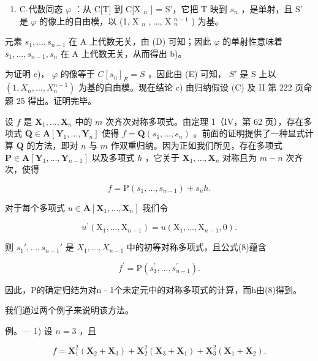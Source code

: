 \begin{enumerate}
\def\labelenumi{(\Alph{enumi})}
\setcounter{enumi}{4}
\tightlist
\item
  C-代数同态 \(\varphi\) ：从 C{[}T{]} 到 C{[}X \(_n\) {]} = S'，它把 T 映到 \(s_n\) ，是单射，且 S' 是 \(\varphi\) 的像上的自由模，以 (1, X \(_n\) , \ldots, X \(_n^{n-1}\) ) 为基。
\end{enumerate}

元素 \(s_{1}, \ldots, s_{n-1}\) 在 A 上代数无关，由 (D) 可知；因此 \(\varphi\) 的单射性意味着 \(s_{1}, \ldots, s_{n-1}, s_{n}\) 在 A 上代数无关，从而得出 b)。

为证明 c)， \(\varphi\) 的像等于 \(C[s_{n}]_{E} = S\) ，因此由 (E) 可知， \(S'\) 是 S 上以 \((1, X_{n}, ..., X_{n}^{n-1})\) 为基的自由模。现在结论 c) 由归纳假设 (C) 及 II 第 222 页命题 25 得出。证明完毕。

设 \(f\) 是 \(\mathbf{X}_1, \ldots, \mathbf{X}_n\) 中的 \(m\) 次齐次对称多项式。由定理 1（IV，第 62 页），存在多项式 \(\mathbf{Q} \in \mathbf{A}[\mathbf{Y}_1, \ldots, \mathbf{Y}_n]\) 使得 \(f = \mathbf{Q}(s_1, \ldots, s_n)\) 。前面的证明提供了一种显式计算 \(\mathbf{Q}\) 的方法，即对 \(n\) 与 \(m\) 作双重归纳。因为正如我们所见，存在多项式 \(\mathbf{P} \in \mathbf{A}[\mathbf{Y}_1, \ldots, \mathbf{Y}_{n-1}]\) 以及多项式 \(h\) ，它关于 \(\mathbf{X}_1, \ldots, \mathbf{X}_n\) 对称且为 \(m - n\) 次齐次，使得

\[
f = \mathrm{P} (s _ {1}, \dots , s _ {n - 1}) + s _ {n} h.\tag{8}
\]

对于每个多项式 \(u \in \mathbf{A}[\mathbf{X}_1, \ldots, \mathbf{X}_n]\) 我们令

\[
u ^ {\prime} \left(\mathrm{X} _ {1}, \dots , \mathrm{X} _ {n - 1}\right) = u \left(\mathrm{X} _ {1}, \dots , \mathrm{X} _ {n - 1}, 0\right).
\]

则 \(s_1', \ldots, s_{n-1}'\) 是 \(X_1, \ldots, X_{n-1}\) 中的初等对称多项式，且公式(8)蕴含

\[
f ^ {\prime} = \mathrm{P} \left(s _ {1} ^ {\prime}, \dots , s _ {n - 1} ^ {\prime}\right).
\]

因此，P的确定归结为对n - 1个未定元中的对称多项式的计算，而h由(8)得到。

我们通过两个例子来说明该方法。

例。--- 1) 设 \(n = 3\) ，且

\[
f = \mathbf {X} _ {1} ^ {2} (\mathbf {X} _ {2} + \mathbf {X} _ {3}) + \mathbf {X} _ {2} ^ {2} (\mathbf {X} _ {3} + \mathbf {X} _ {1}) + \mathbf {X} _ {3} ^ {2} (\mathbf {X} _ {1} + \mathbf {X} _ {2}).
\]

